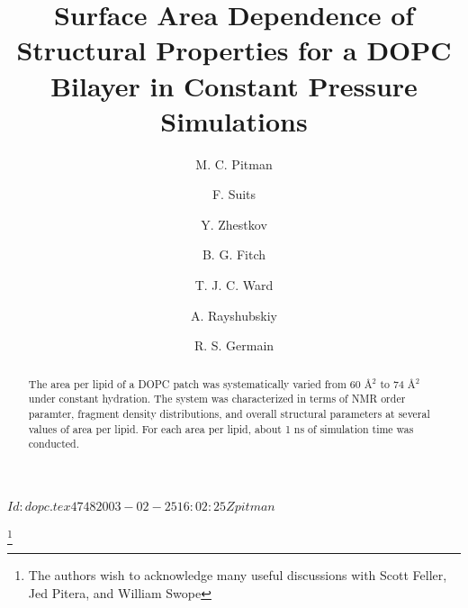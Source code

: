 \documentclass[doublespacing]{elsart}
\begin{document}
\rcsInfo $Id: dopc.tex 4748 2003-02-25 16:02:25Z pitman $


\begin{frontmatter}


\title{Surface Area Dependence of Structural Properties for a DOPC Bilayer in Constant Pressure Simulations }
\thanks[acks]{The authors wish to acknowledge many useful discussions with Scott Feller, Jed Pitera, and William Swope}

\author[ykt]{M. C. Pitman}
\author[ykt]{F. Suits}
\author[ykt]{Y. Zhestkov}
\author[ykt]{B. G. Fitch}
\author[ykt]{T. J. C. Ward}
\author[ykt]{A. Rayshubskiy}
\author[ykt]{R. S. Germain}


\address[ykt]{IBM Thomas J. Watson Research Center\\
P.O. Box 218\\
Yorktown Heights, NY 10598}








\title{}

\begin{abstract}
The area per lipid of a DOPC patch was systematically varied from 60 {\AA$^2$ } to 
74 {\AA$^2$ } under constant hydration. The system was characterized in terms of 
NMR order paramter, fragment density distributions, and overall structural 
parameters at several values of area per lipid. For each area per lipid, 
about 1 ns of simulation time was conducted. 
\end{abstract}

\begin{keyword}

  \PACS
\end{keyword}
\end{frontmatter}
\end{document}
